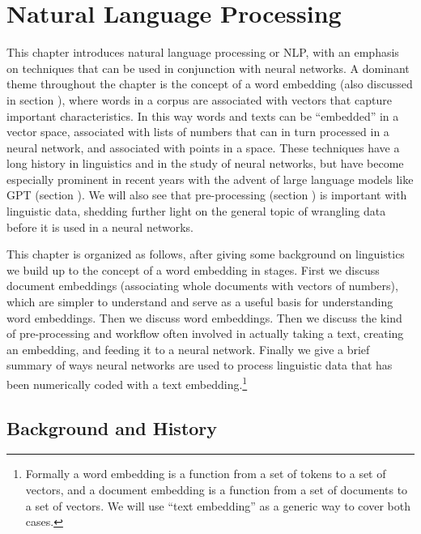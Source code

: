 \chapter{Natural Language Processing}\label{ch_nlp}

This chapter introduces natural language processing or NLP, with an emphasis on techniques that can be used in conjunction with neural networks. A dominant theme throughout the chapter is the concept of a word embedding (also discussed in section ), where words in a corpus are associated with vectors that capture important characteristics.  In this way words and texts can be ``embedded'' in a vector space, associated with lists of numbers that can in turn processed in a neural network, and associated with points in a space. These techniques have a long history in linguistics and in the study of neural networks, but have become especially prominent in recent years with the advent of large language models like GPT (section ). We will also see that pre-processing (section ) is important with linguistic data, shedding further light on the general topic of wrangling data before it is used in a neural networks.

This chapter is organized as follows, after giving some background on linguistics we build up to the concept of a word embedding in stages. First we discuss document embeddings (associating whole documents with vectors of numbers), which are simpler to understand and serve as a useful basis for understanding word embeddings.  Then we discuss word embeddings. Then we discuss the kind of pre-processing and workflow often involved in actually taking a text, creating an embedding, and feeding it to a neural network. Finally we give a brief summary of ways neural networks are used to process linguistic data that has been numerically coded with a text embedding.\footnote{Formally a word embedding is a function from a set of tokens to a set of vectors, and a document embedding is a function from a set of documents to a set of vectors.  We will use ``text embedding'' as a generic way to cover both cases.}

\section{Background and History}

